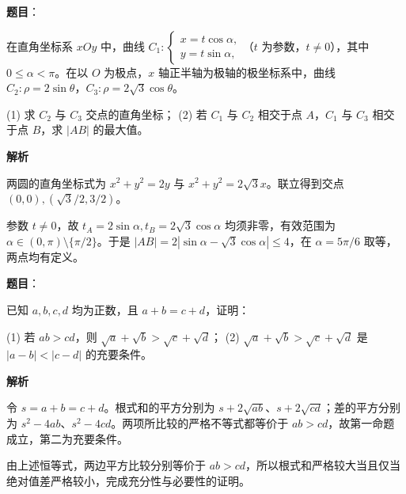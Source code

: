 \begin{answer}

\textbf{题目}：

在直角坐标系 $xOy$ 中，曲线 $C_1:\begin{cases}x=t\cos\alpha,\\y=t\sin\alpha,\end{cases}$（$t$ 为参数，$t\ne0$），其中 $0\leqslant\alpha<\pi$。在以 $O$ 为极点，$x$ 轴正半轴为极轴的极坐标系中，曲线 $C_2:\rho=2\sin\theta$，$C_3:\rho=2\sqrt3\cos\theta$。

(1) 求 $C_2$ 与 $C_3$ 交点的直角坐标；  
(2) 若 $C_1$ 与 $C_2$ 相交于点 $A$，$C_1$ 与 $C_3$ 相交于点 $B$，求 $|AB|$ 的最大值。

\textbf{解析}


两圆的直角坐标式为 $x^2+y^2=2y$ 与 $x^2+y^2=2\sqrt3x$。联立得到交点 $(0,0),(\sqrt3/2,3/2)$。


参数 $t\ne0$，故 $t_A=2\sin\alpha,t_B=2\sqrt3\cos\alpha$ 均须非零，有效范围为 $\alpha\in(0,\pi)\setminus\{\pi/2\}$。于是 $|AB|=2|\sin\alpha-\sqrt3\cos\alpha|\le4$，在 $\alpha=5\pi/6$ 取等，两点均有定义。



\end{answer}
\begin{answer}

\textbf{题目}：

已知 $a,b,c,d$ 均为正数，且 $a+b=c+d$，证明：

(1) 若 $ab>cd$，则 $\sqrt a+\sqrt b>\sqrt c+\sqrt d$；  
(2) $\sqrt a+\sqrt b>\sqrt c+\sqrt d$ 是 $|a-b|<|c-d|$ 的充要条件。

\textbf{解析}


令 $s=a+b=c+d$。根式和的平方分别为 $s+2\sqrt{ab}$、$s+2\sqrt{cd}$；差的平方分别为 $s^2-4ab$、$s^2-4cd$。两项所比较的严格不等式都等价于 $ab>cd$，故第一命题成立，第二为充要条件。


由上述恒等式，两边平方比较分别等价于 $ab>cd$，所以根式和严格较大当且仅当绝对值差严格较小，完成充分性与必要性的证明。



\end{answer}